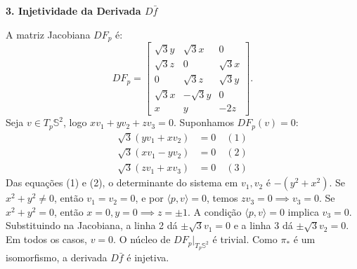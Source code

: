 {	\textbf{3. Injetividade da Derivada $D\bar{f}$}
	
	A matriz Jacobiana $DF_p$ é:
	\begin{equation*}
		DF_p = \begin{bmatrix} 
			\sqrt{3}y & \sqrt{3}x & 0 \\ \sqrt{3}z & 0 & \sqrt{3}x \\ 0 & \sqrt{3}z & \sqrt{3}y \\ \sqrt{3}x & -\sqrt{3}y & 0 \\ x & y & -2z 
		\end{bmatrix}.
	\end{equation*}
	Seja $v \in T_p\mathbb{S}^2$, logo $xv_1 + yv_2 + zv_3 = 0$. Suponhamos $DF_p(v) = 0$:
	\begin{align*}
		\sqrt{3}(yv_1 + xv_2) &= 0 \quad (1) \\
		\sqrt{3}(xv_1 - yv_2) &= 0 \quad (2) \\
		\sqrt{3}(zv_1 + xv_3) &= 0 \quad (3)
	\end{align*}
	Das equações (1) e (2), o determinante do sistema em $v_1, v_2$ é $-(y^2+x^2)$. 
	Se $x^2+y^2 \neq 0$, então $v_1=v_2=0$, e por $\langle p, v \rangle = 0$, temos $zv_3=0 \implies v_3=0$.
	Se $x^2+y^2=0$, então $x=0, y=0 \implies z=\pm 1$. A condição $\langle p, v \rangle = 0$ implica $v_3=0$. Substituindo na Jacobiana, a linha 2 dá $\pm\sqrt{3}v_1=0$ e a linha 3 dá $\pm\sqrt{3}v_2=0$. 
	Em todos os casos, $v=0$. O núcleo de $DF_p|_{T_p\mathbb{S}^2}$ é trivial. Como $\pi_*$ é um isomorfismo, a derivada $D\bar{f}$ é injetiva.
}
